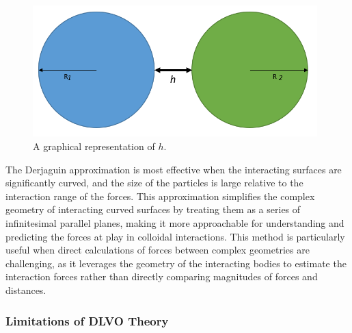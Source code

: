 \begin{figure}[h]     %
        \begin{center}
          \includegraphics[width=110mm]{chapter1/h_graph.PNG}
\end{center}
\caption{A graphical representation of $h$.}
\label{fig:h_graph}                 %
\end{figure}

The Derjaguin approximation is most effective when the interacting surfaces are significantly curved, and the size of the particles is large relative to the interaction range of the forces. This approximation simplifies the complex geometry of interacting curved surfaces by treating them as a series of infinitesimal parallel planes, making it more approachable for understanding and predicting the forces at play in colloidal interactions. This method is particularly useful when direct calculations of forces between complex geometries are challenging, as it leverages the geometry of the interacting bodies to estimate the interaction forces rather than directly comparing magnitudes of forces and distances.

\cite{smolBook1} \cite{Origin2V} \cite{IsGreenBook} \cite{surfpattQ}\cite{Surfquestion} %





%

\subsubsection{Limitations of DLVO Theory}

